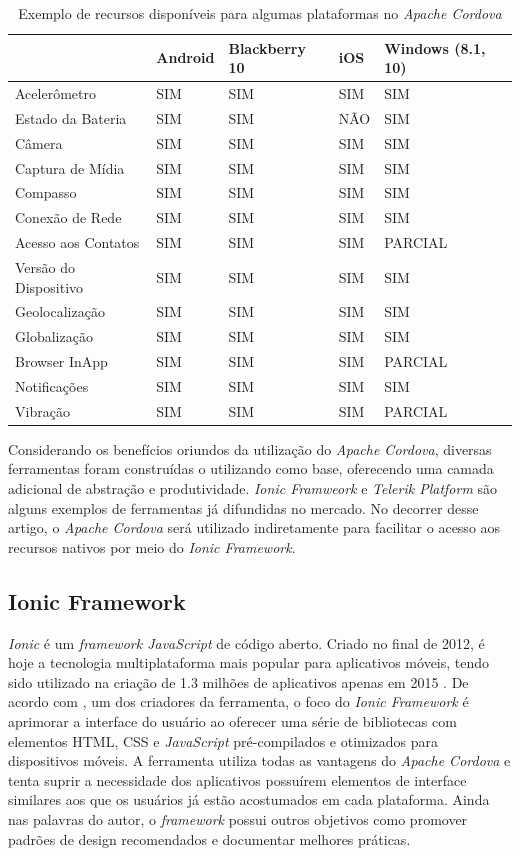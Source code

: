 \begin{table}[]
	\centering
	\caption{Exemplo de recursos disponíveis para algumas plataformas no \textit{Apache Cordova}}
	\label{Meu label}
	\begin{tabular}{|l|l|l|l|l|}
		\hline
	 & Android & Blackberry 10 & iOS  & Windows (8.1, 10) \\ \hline
	Acelerômetro & SIM & SIM & SIM  & SIM \\ \hline
	Estado da Bateria & SIM & SIM &  NÃO  & SIM \\ \hline
	Câmera & SIM & SIM & SIM & SIM \\ \hline
	Captura de Mídia & SIM & SIM & SIM  & SIM \\ \hline
	Compasso & SIM & SIM & SIM  & SIM \\ \hline
	Conexão de Rede & SIM & SIM & SIM & SIM \\ \hline
	Acesso aos Contatos & SIM & SIM & SIM  & PARCIAL \\ \hline
	Versão do Dispositivo & SIM & SIM & SIM  & SIM \\ \hline
	Geolocalização & SIM & SIM & SIM & SIM \\ \hline
	Globalização & SIM & SIM & SIM  & SIM \\ \hline
	Browser InApp & SIM & SIM & SIM & PARCIAL \\ \hline
	Notificações & SIM & SIM & SIM & SIM \\ \hline
	Vibração & SIM & SIM & SIM & PARCIAL \\ \hline
	\end{tabular}
\end{table}

Considerando os benefícios oriundos da utilização do \textit{Apache Cordova}, diversas ferramentas foram construídas o utilizando como base, oferecendo uma camada adicional de abstração e produtividade. \textit{Ionic Framweork} e \textit{Telerik Platform} são alguns exemplos de ferramentas já difundidas no mercado. No decorrer desse artigo, o \textit{Apache Cordova} será utilizado indiretamente para facilitar o acesso aos recursos nativos por meio do \textit{Ionic Framework}.
\subsection{\esp Ionic Framework}

\textit{Ionic} é um \textit{framework JavaScript} de código aberto. Criado no final de 2012, é hoje a tecnologia multiplataforma mais popular para aplicativos móveis, tendo sido utilizado na criação de 1.3 milhões de aplicativos apenas em 2015 \cite{ionic2015}. De acordo com \cite{ionicFIT}, um dos criadores da ferramenta, o foco do \textit{ Ionic Framework} é aprimorar a interface do usuário ao oferecer uma série de bibliotecas com elementos HTML, CSS e \textit{JavaScript} pré-compilados e otimizados para dispositivos móveis. A ferramenta utiliza todas as vantagens do \textit{Apache Cordova} e tenta suprir a necessidade dos aplicativos possuírem elementos de interface similares aos que os usuários já estão acostumados em cada plataforma. Ainda nas palavras do autor, o \textit{framework} possui outros objetivos como promover padrões de design recomendados e documentar melhores práticas.

